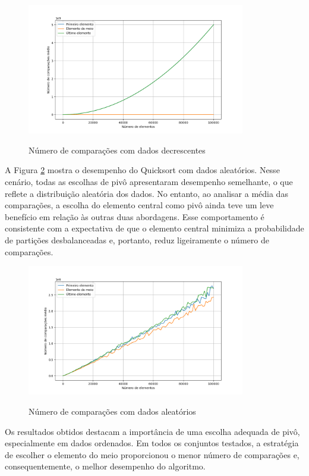 \documentclass[12pt]{article}
\begin{document}
\begin{figure}[H]
\centering
\caption{Número de comparações com dados decrescentes}
\includegraphics[width=0.85\textwidth]{descending.png}
\label{fig:desc}
\end{figure}

A Figura \ref{fig:rand} mostra o desempenho do Quicksort com dados aleatórios. Nesse cenário, todas as escolhas de pivô apresentaram desempenho semelhante, o que reflete a distribuição aleatória dos dados. No entanto, ao analisar a média das comparações, a escolha do elemento central como pivô ainda teve um leve benefício em relação às outras duas abordagens. Esse comportamento é consistente com a expectativa de que o elemento central minimiza a probabilidade de partições desbalanceadas e, portanto, reduz ligeiramente o número de comparações.

\begin{figure}[H]
\centering
\caption{Número de comparações com dados aleatórios}
\includegraphics[width=0.85\textwidth]{random.png}
\label{fig:rand}
\end{figure}

Os resultados obtidos destacam a importância de uma escolha adequada de pivô, especialmente em dados ordenados. Em todos os conjuntos testados, a estratégia de escolher o elemento do meio proporcionou o menor número de comparações e, consequentemente, o melhor desempenho do algoritmo.
\end{document}
